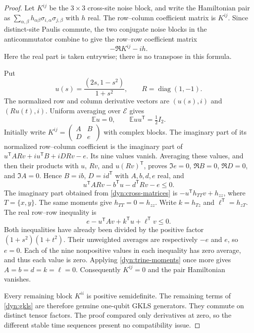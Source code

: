 \documentclass[reqno]{amsart}
\theoremstyle{definition}
\theoremstyle{remark}
\newcommand{\D}{\mathbb D}
\DeclareMathOperator{\diag}{diag}
\begin{document}
\begin{proof}
Let $K^{ij}$ be the $3\times3$ cross-site noise block, and write the
Hamiltonian pair as $\sum_{\alpha,\beta}h_{\alpha\beta}
\sigma_{i,\alpha}\sigma_{j,\beta}$ with $h$ real.  The row--column
coefficient matrix is $K^{ij}$.  Since distinct-site Paulis commute,
the two conjugate noise blocks in the anticommutator combine to give
the row--row coefficient matrix
\begin{equation}\label{dyn:cross-matrices}
 -\Re K^{ij}-ih.
\end{equation}
Here the real part is taken entrywise; there is no transpose in this formula.

Put
\[
 u(s)=\frac{(2s,1-s^2)}{1+s^2},\qquad R=\diag(1,-1).
\]
The normalized row and column derivative vectors are $(u(s),i)$ and
$(Ru(t),i)$.  Uniform averaging over $\mathcal E$ gives
\begin{equation}\label{dyn:trine-moments}
 \mathbb E u=0,\qquad \mathbb E uu^{\mathsf T}=\tfrac12I_2.
\end{equation}
Initially write $K^{ij}=\left(\begin{smallmatrix}A&B\\D&e\end{smallmatrix}\right)$
with complex blocks.  The imaginary part of its normalized row--column
coefficient is the imaginary part of
$u^{\mathsf T}ARv+i u^{\mathsf T}B+iDRv-e$.
Its nine values vanish.  Averaging these values, and then their products
with $u$, $Rv$, and $u(Rv)^{\mathsf T}$, proves
$\Im e=0$, $\Re B=0$, $\Re D=0$, and $\Im A=0$.
Hence $B=ib$, $D=id^{\mathsf T}$ with $A,b,d,e$ real, and
\begin{equation}\label{dyn:lr-inequality}
 u^{\mathsf T}ARv-b^{\mathsf T}u-d^{\mathsf T}Rv-e\le0.
\end{equation}
The imaginary part obtained from \eqref{dyn:cross-matrices} is
$-u^{\mathsf T}h_{TT}v+h_{zz}$, where $T=\{x,y\}$.
The same moments give $h_{TT}=0=h_{zz}$.  Write
$k=h_{Tz}$ and $\ell^{\mathsf T}=h_{zT}$.  The real row--row inequality is
\begin{equation}\label{dyn:ll-inequality}
 e-u^{\mathsf T}Av+k^{\mathsf T}u+\ell^{\mathsf T}v\le0.
\end{equation}
Both inequalities have already been divided by the positive factor
$(1+s^2)(1+t^2)$.  Their unweighted averages are respectively $-e$ and $e$,
so $e=0$.  Each of the nine nonpositive values in each inequality has
zero average, and thus each value is zero.  Applying
\eqref{dyn:trine-moments} once more gives $A=b=d=k=\ell=0$.
Consequently $K^{ij}=0$ and the pair Hamiltonian vanishes.

Every remaining block $K^{ii}$ is positive semidefinite.  The remaining
terms of \eqref{dyn:gkls} are therefore genuine one-qubit GKLS generators.
They commute on distinct tensor factors.  The proof compared only
derivatives at zero, so the different stable time sequences present no
compatibility issue.
\end{proof}
\end{document}
